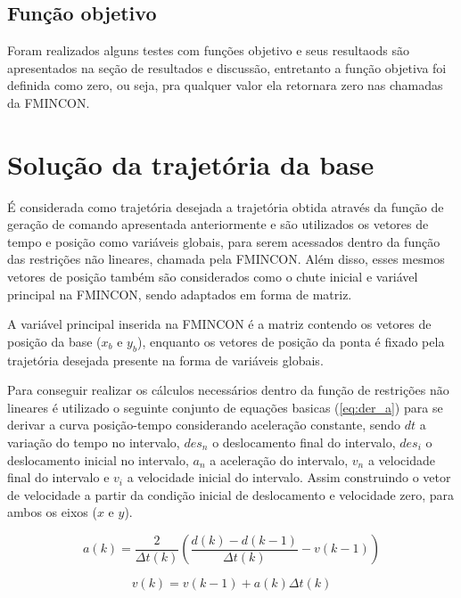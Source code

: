 \subsection{Função objetivo}
Foram realizados alguns testes com funções objetivo e seus resultaods são apresentados na seção de resultados e discussão,
entretanto a função objetiva foi definida como zero, ou seja, pra qualquer valor ela retornara zero nas chamadas da FMINCON.

\section{Solução da trajetória da base}

É considerada como trajetória desejada a trajetória obtida através da função de geração de comando apresentada anteriormente
e são utilizados os vetores de tempo e posição como variáveis globais, para serem acessados dentro da função das
restrições não lineares, chamada pela FMINCON.
Além disso, esses mesmos vetores de posição também são considerados como o chute inicial e variável principal
na FMINCON, sendo adaptados em forma de matriz.

A variável principal inserida na FMINCON é a matriz contendo os vetores de posição da base ($x_b$ e $y_b$),
enquanto os vetores de posição da ponta é fixado pela trajetória desejada presente na forma de variáveis globais.

Para conseguir realizar os cálculos necessários dentro da função de restrições não lineares é utilizado o seguinte conjunto
de equações basicas (\ref{eq:der_a}) para se derivar a curva posição-tempo considerando aceleração constante,
sendo $dt$ a variação do tempo no intervalo, $des_n$ o deslocamento final do intervalo, $des_i$ o deslocamento inicial no intervalo,
$a_n$ a aceleração do intervalo, $v_n$ a velocidade final do intervalo e $v_i$ a velocidade inicial do intervalo.
Assim construindo o vetor de velocidade a partir da condição inicial de deslocamento e velocidade zero, para ambos os eixos ($x$ e $y$).

\begin{equation}
    \label{eq:der_a}      
        a(k) = \frac{2}{\Delta t(k)} \left( \frac{d(k)-d(k-1)}{\Delta t(k)}-v(k-1) \right)
\end{equation}

\begin{equation}
    \label{eq:der_b}      
        v(k) = v(k-1)+a(k) \Delta t(k)
\end{equation}

